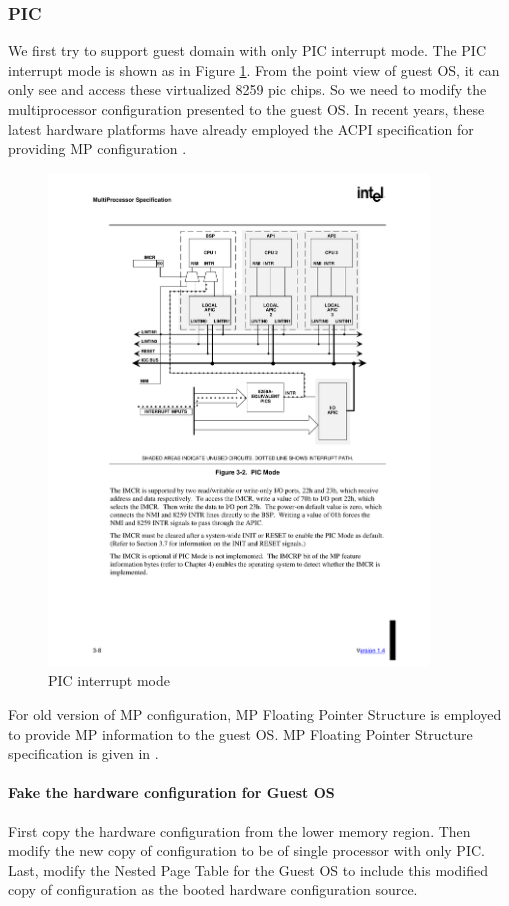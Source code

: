 \documentclass[a4paper,12pt]{article}
\begin{document}
\subsubsection{PIC}
We first try to support guest domain with only PIC interrupt mode. The PIC interrupt mode is shown as in Figure \ref{fig:picmode}.  From the point view of guest OS, it can only see and access these virtualized 8259 pic chips. So we need to modify the multiprocessor  configuration  presented to the guest OS.   In recent years, these latest hardware platforms have already employed the ACPI specification for providing MP configuration \cite{ACPI4}.
\begin{figure}[!ht]
 \centerline{
 \includegraphics[width=0.9\textwidth]{pic_mode}}
 \caption{PIC interrupt mode} \label{fig:picmode}
\end{figure}

For old version of MP configuration, MP Floating Pointer Structure is employed to provide MP information to the guest OS.   MP Floating Pointer Structure specification is given in  \cite{MP}.

\paragraph{Fake the hardware configuration for Guest OS}
First copy the hardware configuration from the lower memory region. Then modify the new copy of configuration to be of single processor with only PIC.  Last, modify the Nested Page Table for the Guest OS to include this modified copy of configuration as the booted hardware configuration source.
\end{document}
